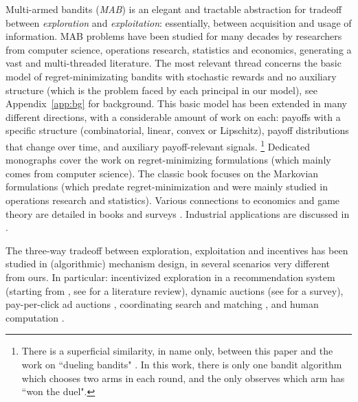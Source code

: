  Multi-armed bandits (\emph{MAB}) is an elegant and tractable abstraction for tradeoff between \emph{exploration} and \emph{exploitation}: essentially, between acquisition and usage of information. MAB problems have been studied for many decades by researchers from computer science, operations research, statistics and economics, generating a vast and multi-threaded literature.  The most relevant thread concerns the basic model of regret-minimizating bandits with stochastic rewards and no auxiliary structure (which is the problem faced by each principal in our model), see Appendix~\ref{app:bg} for background. This basic model has been extended in many different directions, with a considerable amount of work on each: \eg payoffs with a specific structure (\eg combinatorial, linear, convex or Lipschitz), payoff distributions that change over time, and auxiliary payoff-relevant signals.%
\footnote{There is a superficial similarity, in name only, between this paper and the work on ``dueling bandits" \citep[starting from][]{Yue-dueling12,Yue-dueling-icml09}.
In this work, there is only one bandit algorithm which chooses two arms in each round, and the only observes which arm has ``won the duel".}
Dedicated monographs \citep{Bubeck-survey12,slivkins-MABbook,LS19bandit-book} cover the work on regret-minimizing formulations (which mainly comes from computer science). The classic book
\citep{Gittins-book11} focuses on the Markovian formulations (which predate regret-minimization and were mainly studied in operations research and statistics).
Various connections to economics and game theory are detailed in
books \citep{CesaBL-book,slivkins-MABbook} and surveys \citep{Bergemann-survey06,Horner-survey16}. Industrial applications are discussed in \citep{DS-arxiv}.

The three-way tradeoff between exploration, exploitation and incentives has been studied in (algorithmic) mechanism design, in several scenarios very different from ours. In particular: 
incentivized exploration in a recommendation system
(starting from \citet{Kremer-JPE14,Che-13}, see \citet[Ch. 11.6]{slivkins-MABbook} for a literature review),
dynamic auctions
    (\eg see \citet{DynAuctions-survey10} for a survey),
pay-per-click ad auctions
    \citep[\eg][]{MechMAB-ec09,DevanurK09,Transform-ec10-jacm},
coordinating search and matching
    \citep{Bobby-Glen-ec16},
and human computation
    \citep[\eg][]{RepeatedPA-ec14,Ghosh-itcs13,Krause-www13}.

